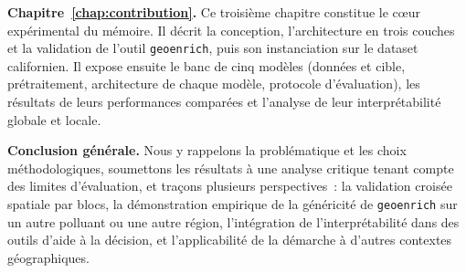 \textbf{Chapitre~\ref{chap:contribution}.} Ce troisi\`eme chapitre constitue le c{\oe}ur exp\'erimental du m\'emoire. Il d\'ecrit la conception, l'architecture en trois couches et la validation de l'outil \texttt{geoenrich}, puis son instanciation sur le dataset californien. Il expose ensuite le banc de cinq mod\`eles (donn\'ees et cible, pr\'etraitement, architecture de chaque mod\`ele, protocole d'\'evaluation), les r\'esultats de leurs performances compar\'ees et l'analyse de leur interpr\'etabilit\'e globale et locale.

\textbf{Conclusion g\'en\'erale.} Nous y rappelons la probl\'ematique et les choix m\'ethodologiques, soumettons les r\'esultats \`a une analyse critique tenant compte des limites d'\'evaluation, et tra\c{c}ons plusieurs perspectives~: la validation crois\'ee spatiale par blocs, la d\'emonstration empirique de la g\'en\'ericit\'e de \texttt{geoenrich} sur un autre polluant ou une autre r\'egion, l'int\'egration de l'interpr\'etabilit\'e dans des outils d'aide \`a la d\'ecision, et l'applicabilit\'e de la d\'emarche \`a d'autres contextes g\'eographiques.


\myCleanStarChapterEnd
